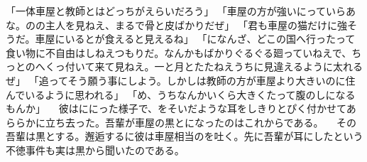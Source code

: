 \documentclass[a5j]{ltjbook}
\begin{document}
「一体車屋と教師とはどっちがえらいだろう」 \newline
「車屋の方が強いにっていらあな。のの主人を見ねえ、まるで骨と皮ばかりだぜ」 \newline
「君も車屋の猫だけに強そうだ。車屋にいるとが食えると見えるね」 \newline
「になんざ、どこの国へ行ったって食い物に不自由はしねえつもりだ。なんかもばかりぐるぐる廻っていねえで、ちっとのへくっ付いて来て見ねえ。一と月とたたねえうちに見違えるように太れるぜ」 \newline
「追ってそう願う事にしよう。しかしは教師の方が車屋より大きいのに住んでいるように思われる」 \newline
「め、うちなんかいくら大きくたって腹のしになるもんか」 \newline
　彼はににった様子で、をそいだような耳をしきりとぴく付かせてあららかに立ち去った。吾輩が車屋の黒とになったのはこれからである。 \newline
　その吾輩は黒とする。邂逅するに彼は車屋相当のを吐く。先に吾輩が耳にしたという不徳事件も実は黒から聞いたのである。 \newline
\end{document}
